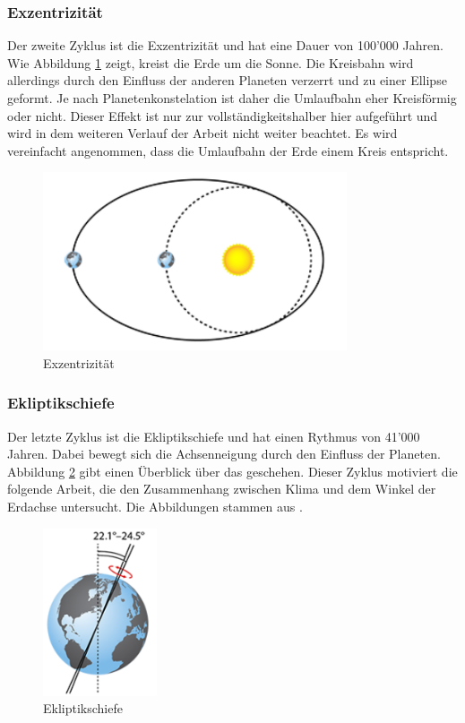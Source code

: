\begin{refsection}
\subsubsection{Exzentrizität}
Der zweite Zyklus ist die Exzentrizität und hat eine Dauer von 100'000 Jahren. Wie Abbildung \ref{fig:abb2} zeigt, kreist die Erde um die Sonne. Die Kreisbahn wird allerdings durch den Einfluss der anderen Planeten verzerrt und zu einer Ellipse geformt. Je nach Planetenkonstelation ist daher die Umlaufbahn eher Kreisförmig oder nicht. Dieser Effekt ist nur zur vollständigkeitshalber hier aufgeführt und wird in dem weiteren Verlauf der Arbeit nicht weiter beachtet. Es wird vereinfacht angenommen, dass die Umlaufbahn der Erde einem Kreis entspricht. 
%
\begin{figure}
	\centering
	\includegraphics[width= 0.8\textwidth]{Eccentricity.png}
	\caption[Exzentrizität]{Exzentrizität}
	\label{fig:abb2}
\end{figure}

\subsubsection{Ekliptikschiefe}
Der letzte Zyklus ist die Ekliptikschiefe und hat einen Rythmus von 41'000 Jahren. Dabei bewegt sich die Achsenneigung durch den Einfluss der Planeten. Abbildung \ref{fig:abb3} gibt einen Überblick über das geschehen. Dieser Zyklus motiviert die folgende Arbeit, die den Zusammenhang zwischen Klima und dem Winkel der Erdachse untersucht. Die Abbildungen stammen aus \cite{fm}.
%
\begin{figure}
	\centering
	\includegraphics[width= 0.3\textwidth]{Obliquity.png}
	\caption[Ekliptikschiefe]{Ekliptikschiefe}
	\label{fig:abb3}
\end{figure}
%
\newpage


\end{refsection}
